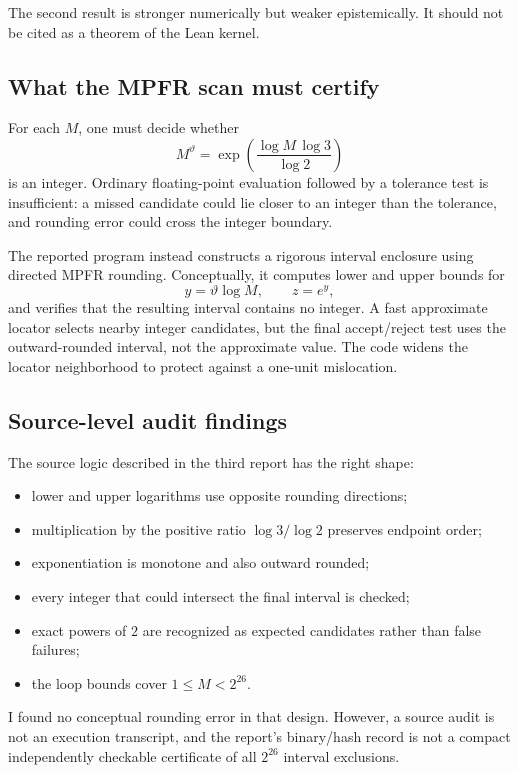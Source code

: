 \documentclass[11pt,oneside]{article}
\theoremstyle{definition}
\theoremstyle{remark}
\begin{document}
The second result is stronger numerically but weaker epistemically.  It should not be cited as
a theorem of the Lean kernel.

\subsection{What the MPFR scan must certify}

For each $M$, one must decide whether
\[
  M^{\vartheta}=\exp\!\left(\frac{\log M\,\log3}{\log2}\right)
\]
is an integer.  Ordinary floating-point evaluation followed by a tolerance test is
insufficient: a missed candidate could lie closer to an integer than the tolerance, and
rounding error could cross the integer boundary.

The reported program instead constructs a rigorous interval enclosure using directed MPFR
rounding.  Conceptually, it computes lower and upper bounds for
\[
  y=\vartheta\log M,
  \qquad
  z=e^y,
\]
and verifies that the resulting interval contains no integer.  A fast approximate locator
selects nearby integer candidates, but the final accept/reject test uses the outward-rounded
interval, not the approximate value.  The code widens the locator neighborhood to protect
against a one-unit mislocation.

\subsection{Source-level audit findings}

The source logic described in the third report has the right shape:

\begin{itemize}
\item lower and upper logarithms use opposite rounding directions;
\item multiplication by the positive ratio $\log3/\log2$ preserves endpoint order;
\item exponentiation is monotone and also outward rounded;
\item every integer that could intersect the final interval is checked;
\item exact powers of $2$ are recognized as expected candidates rather than false failures;
\item the loop bounds cover $1\le M<2^{26}$.
\end{itemize}

I found no conceptual rounding error in that design.  However, a source audit is not an
execution transcript, and the report's binary/hash record is not a compact independently
checkable certificate of all $2^{26}$ interval exclusions.
\end{document}
